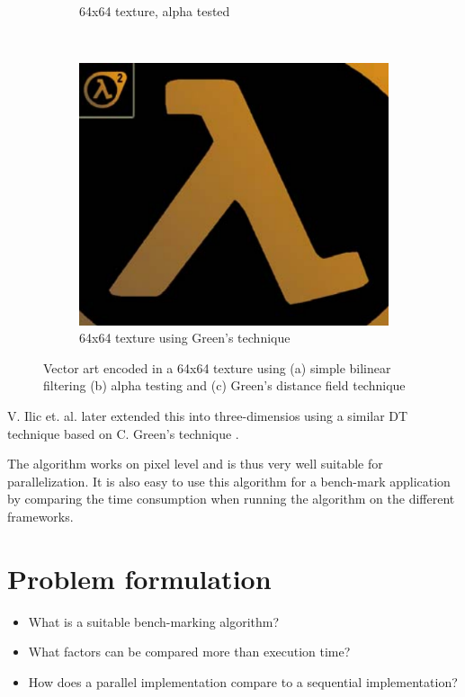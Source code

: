 \documentclass{article}
\begin{document}
\begin{figure}[!h]
\begin{subfigure}[b]{0.3\textwidth}
        \caption{64x64 texture, alpha tested}
        \label{fig:valveA}
    \end{subfigure}
    ~ 
    \begin{subfigure}[b]{0.3\textwidth}
        \includegraphics[width=\textwidth]{Figs/ValveGreensTechnique.png}
        \caption{64x64 texture using Green's technique}
        \label{fig:mouse}
    \end{subfigure}
    \caption{Vector art encoded in a 64x64 texture using (a) simple bilinear filtering (b) alpha testing and (c) Green's distance field technique}\label{fig:animals}
    \label{fig:valve}
\end{figure}

V. Ilic et. al. later extended this into three-dimensios using a similar DT technique based on C. Green's technique \cite{ilic2015precise}. 

The algorithm works on pixel level and is thus very well suitable for parallelization. It is also easy to use this algorithm for a bench-mark application by comparing the time consumption when running the algorithm on the different frameworks.


\section{Problem formulation}
\begin{itemize}
    \item What is a suitable bench-marking algorithm?
    \item What factors can be compared more than execution time?
    \item How does a parallel implementation compare to a sequential implementation?
\end{itemize}
\end{document}
